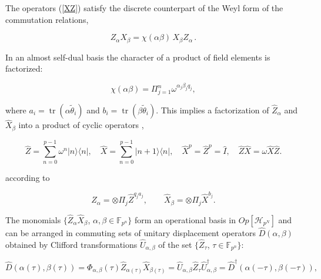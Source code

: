 \documentclass[quantumrep,article,submit,pdftex,moreauthors]{Definitions/mdpi}
\DeclareMathOperator{\tr}{tr}
\begin{document}
The operators (\ref{XZ}) satisfy the discrete counterpart of the Weyl form of
the commutation relations,

\begin{equation}
  Z_{\alpha}X_{\beta }
  = \chi \left( \alpha \beta \right) \, X_{\beta }Z_{\alpha} \,.
  \label{commutation_relation}
\end{equation}

In an almost self-dual basis the character of a product of field elements is
factorized:

\begin{equation}
  \chi\left( \alpha \beta \right)
  = \Pi_{j=1}^{n} \omega^{\alpha_{j}\beta_{j}q_{j}},
  \label{chi fact}
\end{equation}

where $a_{i} = \tr(\alpha \tilde{\theta}_{i})$ and $b_{i} = \tr(\beta
\tilde{\theta }_{i})$. This implies a factorization of $\hat{Z}_{\alpha}$ and
$\hat{X}_{\beta }$ into a product of cyclic operators
\cite{Schwinger1,Schwinger2},

\begin{equation}
  \hat{Z}
  = \sum_{n=0}^{p-1} \omega^{n} |n\rangle \langle n|, \quad \hat{X}
  = \sum_{n=0}^{p-1} |n+1\rangle \langle n|,
  \quad \hat{X}^{p} = \hat{Z}^{p} = \hat{I},
  \quad \hat{Z}\hat{X} = \omega \hat{X}\hat{Z}.
\end{equation}

according to

\begin{equation}
  \hat{Z}_{\alpha }
  = \otimes \Pi_{j}\hat{Z}^{q_{j}a_{j}},
  \qquad \hat{X}_{\beta} = \otimes \Pi _{j}\hat{X}^{b_{j}}.
  \label{ZXq}
\end{equation}

The monomials $\{\hat{Z}_{\alpha }\hat{X}_{\beta }$, $\alpha ,\beta \in
\mathbb{F}_{p^{n}}\}$ form an operational basis in $Op[\mathcal{H}_{p^{N}}]$ and
can be arranged in commuting sets of unitary displacement operators
$\hat{D}(\alpha,\beta)$ obtained by Clifford transformations
$\hat{U}_{\alpha,\beta}$ of the set $\{\hat{Z}_{\tau}$, $\tau \in
\mathbb{F}_{p^{n}}\}$:

\begin{equation}
  \hat{D} \left( \alpha (\tau ),\beta (\tau )\right)
  = \Phi_{\alpha,\beta} \left( \tau \right)
  \hat{Z}_{\alpha (\tau)}\hat{X}_{\beta(\tau)}
  = \hat{U}_{\alpha,\beta}\hat{Z}_{\tau}\hat{U}_{\alpha,\beta }^{\dagger}
  = \hat{D}^{\dagger }\left(\alpha (-\tau),\beta (-\tau )\right),
  \label{D}
\end{equation}
\end{document}
